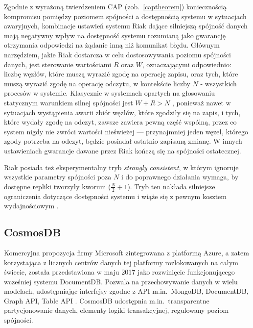 Zgodnie z wyrażoną twierdzeniem CAP (zob.\ \ref{captheorem}) koniecznością kompromisu pomiędzy poziomem spójności a dostępnością systemu w sytuacjach awaryjnych, kombinacje ustawień systemu Riak dające silniejszą spójność danych mają negatywny wpływ na dostępność systemu rozumianą jako gwarancję otrzymania odpowiedzi na żądanie inną niż komunikat błędu. Głównym narzędziem, jakie Riak dostarcza w celu dostosowywania poziomu spójności danych, jest sterowanie wartościami $R$ oraz $W$, oznaczającymi odpowiednio: liczbę węzłów, które muszą wyrazić zgodę na operację zapisu, oraz tych, które muszą wyrazić zgodę na operację odczytu, w kontekście liczby $N$ - wszystkich procesów w systemie. Klasycznie w systemach opartych na głosowaniu statycznym warunkiem silnej spójności jest $W + R > N$ \cite{goldw89}, ponieważ nawet w sytuacjach wystąpienia awarii zbiór węzłów, które zgodziły się na zapis, i tych, które wydały zgodę na odczyt, zawsze zawiera pewną część wspólną, przez co system nigdy nie zwróci wartości nieświeżej --- przynajmniej jeden węzeł, którego zgody potrzeba na odczyt, będzie posiadał ostatnio zapisaną zmianę. W innych ustawieniach gwarancje dawane przez Riak kończą się na spójności ostatecznej.

Riak posiada też eksperymentalny tryb \textit{strongly consistent}, w którym ignoruje wszystkie parametry spójności poza $N$ i do poprawnego działania wymaga, by dostępne repliki tworzyły kworum ($\frac{N}{2} + 1$). Tryb ten nakłada silniejsze ograniczenia dotyczące dostępności systemu i wiąże się z pewnym kosztem wydajnościowym \cite{riakstrongref}.

\subsection{CosmosDB}

Komercyjna propozycja firmy Microsoft zintegrowana z platformą Azure, a zatem korzystająca z
licznych centrów danych tej platformy rozlokowanych na całym świecie, została przedstawiona w maju
2017 jako rozwinięcie funkcjonującego wcześniej systemu DocumentDB. Pozwala na przechowywanie danych
w wielu modelach, udostępniając interfejsy zgodne z API m.in.\ MongoDB, DocumentDB, Graph API, Table
API \cite{cosmos1}. CosmosDB udostępnia m.in.\ transparentne partycjonowanie danych, elementy logiki transakcyjnej, regulowany poziom spójności.

